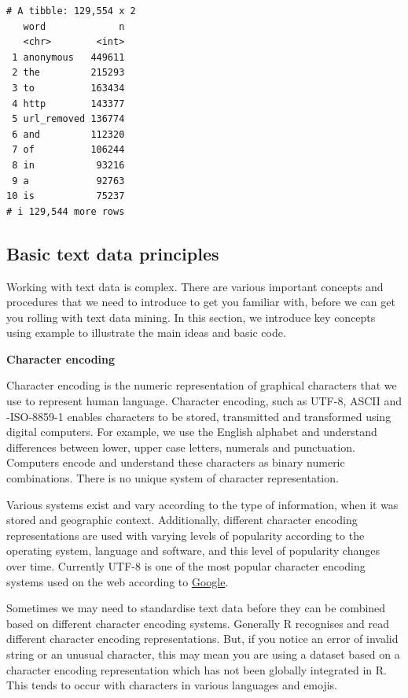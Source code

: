 \documentclass[
  letterpaper,
  DIV=11,
  numbers=noendperiod]{scrreprt}
\begin{document}
\begin{verbatim}
# A tibble: 129,554 x 2
   word             n
   <chr>        <int>
 1 anonymous   449611
 2 the         215293
 3 to          163434
 4 http        143377
 5 url_removed 136774
 6 and         112320
 7 of          106244
 8 in           93216
 9 a            92763
10 is           75237
# i 129,544 more rows
\end{verbatim}

\hypertarget{basic-text-data-principles}{%
\subsection{Basic text data
principles}\label{basic-text-data-principles}}

Working with text data is complex. There are various important concepts
and procedures that we need to introduce to get you familiar with,
before we can get you rolling with text data mining. In this section, we
introduce key concepts using example to illustrate the main ideas and
basic code.

\textbf{Character encoding}

Character encoding is the numeric representation of graphical characters
that we use to represent human language. Character encoding, such as
UTF-8, ASCII and -ISO-8859-1 enables characters to be stored,
transmitted and transformed using digital computers. For example, we use
the English alphabet and understand differences between lower, upper
case letters, numerals and punctuation. Computers encode and understand
these characters as binary numeric combinations. There is no unique
system of character representation.

Various systems exist and vary according to the type of information,
when it was stored and geographic context. Additionally, different
character encoding representations are used with varying levels of
popularity according to the operating system, language and software, and
this level of popularity changes over time. Currently UTF-8 is one of
the most popular character encoding systems used on the web according to
\href{https://googleblog.blogspot.com/2012/02/unicode-over-60-percent-of-web.html}{Google}.

Sometimes we may need to standardise text data before they can be
combined based on different character encoding systems. Generally R
recognises and read different character encoding representations. But,
if you notice an error of invalid string or an unusual character, this
may mean you are using a dataset based on a character encoding
representation which has not been globally integrated in R. This tends
to occur with characters in various languages and emojis.
\end{document}
